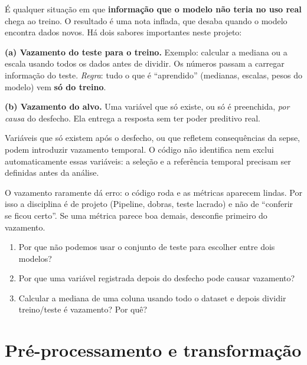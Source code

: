 \documentclass[11pt,a4paper]{article}
\begin{document}
\begin{conceito}
É qualquer situação em que \textbf{informação que o modelo não teria no uso real} chega ao treino. O resultado é uma nota
inflada, que desaba quando o modelo encontra dados novos. Há dois sabores importantes neste projeto:

\textbf{(a) Vazamento do teste para o treino.} Exemplo: calcular a mediana ou a escala usando todos os dados antes de dividir. Os números
passam a carregar informação do teste. \emph{Regra}: tudo o que é ``aprendido'' (medianas, escalas, pesos do modelo) vem \textbf{só do treino}.

\textbf{(b) Vazamento do alvo.} Uma variável que só existe, ou só é preenchida, \emph{por causa} do desfecho. Ela entrega a resposta
sem ter poder preditivo real.
\end{conceito}

Variáveis que só existem após o desfecho, ou que refletem consequências da sepse, podem introduzir vazamento temporal. O código não identifica nem exclui automaticamente essas variáveis: a seleção e a referência temporal precisam ser definidas antes da análise.

\begin{atencao}
O vazamento raramente dá erro: o código roda e as métricas aparecem lindas. Por isso a disciplina é de projeto (Pipeline, dobras, teste lacrado) e não de ``conferir se ficou certo''. Se uma métrica parece boa demais, desconfie primeiro do vazamento.
\end{atencao}

\begin{teste}
\begin{enumerate}
  \item Por que não podemos usar o conjunto de teste para escolher entre dois modelos?
  \item Por que uma variável registrada depois do desfecho pode causar vazamento?
  \item Calcular a mediana de uma coluna usando todo o dataset e depois dividir treino/teste é vazamento? Por quê?
\end{enumerate}
\end{teste}

\section{Pré-processamento e transformação}
\end{document}
